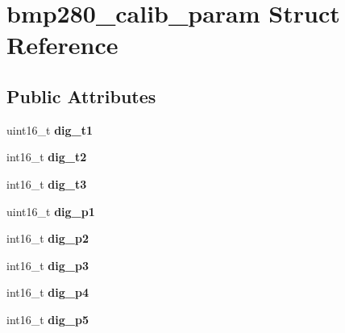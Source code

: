 \hypertarget{structbmp280__calib__param}{}\section{bmp280\+\_\+calib\+\_\+param Struct Reference}
\label{structbmp280__calib__param}
\subsection*{Public Attributes}
\begin{DoxyCompactItemize}
\item 
\mbox{\label{structbmp280__calib__param_a380deedf1fd22fee8355ed5c4c62e1aa}} 
uint16\+\_\+t {\bfseries dig\+\_\+t1}
\item 
\mbox{\label{structbmp280__calib__param_a7b1f3dd1751ff62d46cf147c5d9ac947}} 
int16\+\_\+t {\bfseries dig\+\_\+t2}
\item 
\mbox{\label{structbmp280__calib__param_a9c59e7ec64cdff0b09f36c858ce49bf1}} 
int16\+\_\+t {\bfseries dig\+\_\+t3}
\item 
\mbox{\label{structbmp280__calib__param_a0e9c2b92698fd08d605f815f4ce99634}} 
uint16\+\_\+t {\bfseries dig\+\_\+p1}
\item 
\mbox{\label{structbmp280__calib__param_a061c194e19ddaddac5bb37bb1c59db90}} 
int16\+\_\+t {\bfseries dig\+\_\+p2}
\item 
\mbox{\label{structbmp280__calib__param_a537113662a48ddbb172ffb210cf0b5ea}} 
int16\+\_\+t {\bfseries dig\+\_\+p3}
\item 
\mbox{\label{structbmp280__calib__param_af4645f5475865d6398235d2a6c910325}} 
int16\+\_\+t {\bfseries dig\+\_\+p4}
\item 
\mbox{\label{structbmp280__calib__param_a4168d8972d683bc1c60e19f6307131b1}} 
int16\+\_\+t {\bfseries dig\+\_\+p5}
\item 
\mbox{\label{structbmp280__calib__param_afc704b1a24a0493b0b8a4a7623cf72e4}} 

\end{DoxyCompactItemize}
